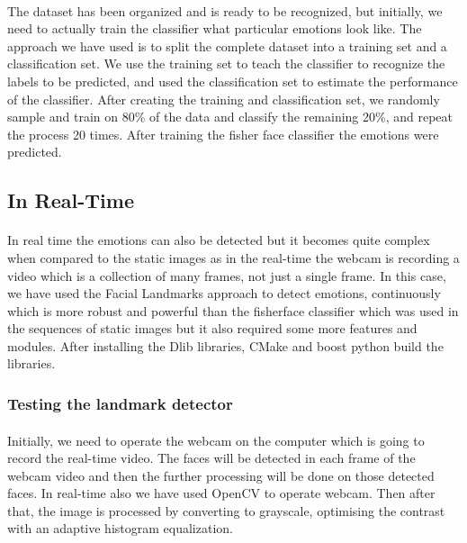 \documentclass[a4paper,12pt,oneside]{article}
\begin{document}
\paragraph{}
The dataset has been organized and is ready to be
recognized, but initially, we need to actually train the
classifier what particular emotions look like. The
approach we have used is to split the complete dataset
into a training set and a classification set. We use the
training set to teach the classifier to recognize the labels
to be predicted, and used the classification set to estimate
the performance of the classifier. After creating the
training and classification set, we randomly sample and
train on 80\% of the data and classify the remaining 20\%,
and repeat the process 20 times. After training the
fisher face classifier the emotions were predicted.


\subsection{In Real-Time}
\paragraph{}

In real time the emotions can also be detected but it
becomes quite complex when compared to the static
images as in the real-time the webcam is recording a
video which is a collection of many frames, not just a
single frame. In this case, we have used the Facial
Landmarks approach to detect emotions,
continuously which is more robust and powerful than the
fisherface classifier which was used in the
sequences of static images but it also required some more
features and modules. After installing the Dlib libraries,
CMake and boost python build the libraries.

\subsubsection{Testing the landmark detector}
\paragraph{}
Initially, we need to operate the webcam on the computer
which is going to record the real-time video. The faces
will be detected in each frame of the webcam video and
then the further processing will be done on those
detected faces. In real-time also we have used OpenCV
to operate webcam. Then after that, the image is
processed by converting to grayscale, optimising the
contrast with an adaptive histogram equalization.
\end{document}
